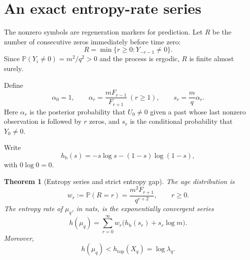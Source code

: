 \documentclass[11pt,a4paper]{amsart}
\newtheorem{theorem}{Theorem}[section]
\theoremstyle{definition}
\theoremstyle{remark}
\newcommand{\Prob}{\mathbb P}
\newcommand{\htop}{h_{\mathrm{top}}}
\newcommand{\hb}{h_{\mathrm b}}
\begin{document}
\section{An exact entropy-rate series}
\label{sec:entropy}

The nonzero symbols are regeneration markers for prediction.  Let $R$ be
the number of consecutive zeros immediately before time zero:
\begin{equation}\label{eq:age}
 R=\min\{r\geq0:Y_{-r-1}\ne0\}.
\end{equation}
Since $\Prob(Y_i\ne0)=m^2/q^2>0$ and the process is ergodic, $R$ is finite
almost surely.

Define
\begin{equation}\label{eq:alpha-s}
 \alpha_0=1,
 \qquad
 \alpha_r=\frac{mF_{r-1}}{F_{r+1}}\ (r\geq1),
 \qquad
 s_r=\frac{m}{q}\alpha_r.
\end{equation}
Here $\alpha_r$ is the posterior probability that $U_0\ne0$ given a past
whose last nonzero observation is followed by $r$ zeros, and $s_r$ is the
conditional probability that $Y_0\ne0$.

Write
\[
 \hb(s)=-s\log s-(1-s)\log(1-s),
\]
with $0\log0=0$.

\begin{theorem}[Entropy series and strict entropy gap]
\label{thm:entropy}
The age distribution is
\begin{equation}\label{eq:age-law}
 w_r:=\Prob(R=r)=\frac{m^2F_{r+1}}{q^{r+2}},
 \qquad r\geq0.
\end{equation}
The entropy rate of $\mu_q$, in nats, is the exponentially convergent series
\begin{equation}\label{eq:entropy-series}
 h(\mu_q)
 =\sum_{r=0}^{\infty}w_r
 \bigl(\hb(s_r)+s_r\log m\bigr).
\end{equation}
Moreover,
\begin{equation}\label{eq:strict-gap}
 h(\mu_q)<\htop(X_q)=\log\lambda_q.
\end{equation}
\end{theorem}
\end{document}
